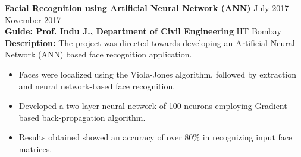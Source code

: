 \textbf{Facial Recognition using Artificial Neural Network (ANN)} \hfill{July 2017 - November 2017}\\
\textbf{Guide: Prof. Indu J., Department of Civil Engineering} \hfill{IIT Bombay} \\
\textbf{Description:} {The project was directed towards developing an Artificial Neural Network (ANN) based face recognition application.}
\begin{itemize}
    \setlength\itemsep{0.7mm}
    \item {Faces were localized using the Viola-Jones algorithm, followed by extraction and neural network-based face recognition.}
    \item {Developed a two-layer neural network of 100 neurons employing Gradient-based back-propagation algorithm.}
    \item {Results obtained showed an accuracy of over 80\% in recognizing input face matrices.}
\end{itemize}